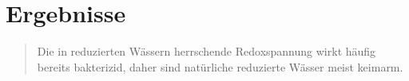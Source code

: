 \chapter{Ergebnisse}\label{ch:erg} 
\begin{quote}
Die in reduzierten Wässern herrschende Redoxspannung wirkt häufig bereits bakterizid, daher sind natürliche reduzierte Wässer meist keimarm. \citep[S.~40]{huetter}
\end{quote}